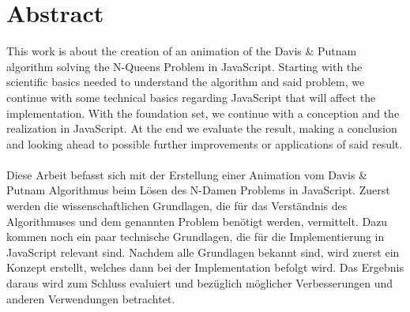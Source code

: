 
\chapter*{Abstract}
This work is about the creation of an animation of the Davis \& Putnam algorithm solving the N-Queens Problem in JavaScript. Starting with the scientific basics needed to understand the algorithm and said problem, we continue with some technical basics regarding JavaScript that will affect the implementation. With the foundation set, we continue with a conception and the realization in JavaScript. At the end we evaluate the result, making a conclusion and looking ahead to possible further improvements or applications of said result.
\\
\\
Diese Arbeit befasst sich mit der Erstellung einer Animation vom Davis \& Putnam Algorithmus beim Lösen des N-Damen Problems in JavaScript. Zuerst werden die wissenschaftlichen Grundlagen, die für das Verständnis des Algorithmuses und dem genannten Problem benötigt werden, vermittelt. Dazu kommen noch ein paar technische Grundlagen, die für die Implementierung in JavaScript relevant sind. Nachdem alle Grundlagen bekannt sind, wird zuerst ein Konzept erstellt, welches dann bei der Implementation befolgt wird. Das Ergebnis daraus wird zum Schluss evaluiert und bezüglich möglicher Verbesserungen und anderen Verwendungen betrachtet.